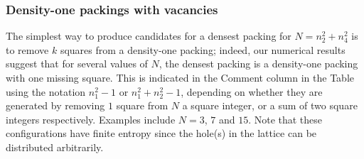 \documentclass[preprint,aps]{revtex4}
\begin{document}
\begin{figure}[H]
\caption{\label{fig:aligned}}
\end{figure}



\subsubsection{Density-one packings with vacancies}
\label{sec:vacancies}
The simplest way to produce candidates for a densest packing for $N=n_2^2 + n_4^2$ is to remove $k$ squares from a density-one packing; indeed, our numerical results suggest that for several values of $N$, the densest packing is a density-one packing with one missing square.  This is indicated in the Comment column in the Table using the notation $n_1^2-1$ or $n_1^2+ n_2^2-1$, depending on whether they are generated by removing $1$ square from $N$ a square integer, or a sum of two square integers respectively. Examples include $N=3$, $7$ and $15$. Note that these configurations have finite entropy since the hole(s) in the lattice can be distributed arbitrarily.

\end{document}
